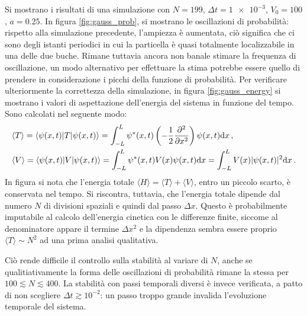 \documentclass[a4paper, titlepage]{article}
\numberwithin{equation}{section}
\begin{document}
Si mostrano i risultati di una simulazione con $N = 199$, $\Delta t = \num{1e-3}$, $V_0 = 100$, $a = 0.25$. In figura \ref{fig:gauss_prob}, si mostrano le oscillazioni di probabilità: rispetto alla simulazione precedente, l'ampiezza è aumentata, ciò significa che ci sono degli istanti periodici in cui la particella è quasi totalmente localizzabile in una delle due buche. Rimane tuttavia ancora non banale stimare la frequenza di oscillazione, un modo alternativo per effettuare la stima potrebbe essere quello di prendere in considerazione i picchi della funzione di probabilità. Per verificare ulteriormente la correttezza della simulazione, in figura \ref{fig:gauss_energy} si mostrano i valori di aspettazione dell'energia del sistema in funzione del tempo. Sono calcolati nel seguente modo:
\begin{align*}
    &\langle T \rangle = \langle \psi(x,t) | T | \psi(x,t) \rangle = \int_{-L}^{L} \psi^*(x,t) \left(-\frac{1}{2}\pdv[2]{x}\right)\psi(x,t) \dd x\, , \\
    &\langle V \rangle = \langle \psi(x,t) | V | \psi(x,t) \rangle = \int_{-L}^{L} \psi^*(x,t) V(x) \psi(x,t) \dd x = \int_{-L}^{L} V(x) |\psi(x,t)|^2 \dd x\, .
\end{align*}
In figura si nota che l'energia totale $\langle H \rangle = \langle T \rangle  + \langle V \rangle$, entro un piccolo scarto, è conservata nel tempo.
Si riscontra, tuttavia, che l'energia totale dipende dal numero $N$ di divisioni spaziali e quindi dal passo $\Delta x$. Questo è probabilmente imputabile al calcolo dell'energia cinetica con le differenze finite, siccome al denominatore appare il termine $\Delta x^2$ e la dipendenza sembra essere proprio $\langle T \rangle \sim N^2$ ad una prima analisi qualitativa. 

Ciò rende difficile il controllo sulla stabilità al variare di $N$, anche se qualitiativamente la forma delle oscillazioni di probabilità rimane la stessa per $100 \lesssim N \lesssim 400$. La stabilità con passi temporali diversi è invece verificata, a patto di non scegliere $\Delta t \gtrsim 10^{-2}$: un passo troppo grande invalida l'evoluzione temporale del sistema.
\end{document}
